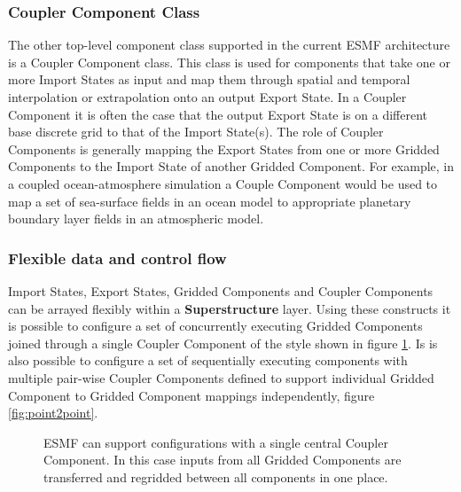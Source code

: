 \subsubsection{Coupler Component Class}
The other top-level component class supported in the current ESMF architecture is a Coupler Component class.
This class is used for components that take one or more Import States as input and map them through
spatial and temporal interpolation or extrapolation onto an output Export State. In a Coupler Component
it is often the case that the output Export State is on a different base discrete grid to that of
the Import State(s). The role of Coupler Components is generally mapping the Export States from one or
more Gridded Components to the Import State of another Gridded Component. For example, in a coupled
ocean-atmosphere simulation a Couple Component would be used to map a set of sea-surface fields 
in an ocean model to appropriate planetary boundary layer fields in an atmospheric model.
\subsubsection{Flexible data and control flow}
Import States, Export States, Gridded Components and Coupler Components can be arrayed flexibly
within a {\bf Superstructure} layer. Using these constructs it is possible to configure a set of concurrently
executing Gridded Components joined through a single Coupler Component of the style shown in figure 
\ref{fig:hubspoke}. Is is also possible to configure a set of sequentially executing components with multiple
pair-wise Coupler Components defined to support individual Gridded Component to Gridded 
Component mappings independently, figure \ref{fig:point2point}.

\begin{figure}
\caption{ESMF can support configurations with a single central Coupler Component. In this case inputs from all Gridded 
Components are transferred and regridded between all components in one place.}
\label{fig:hubspoke}
\end{figure}

